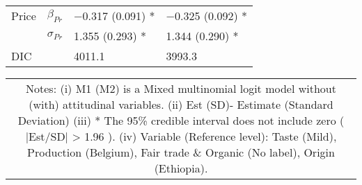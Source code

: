 \documentclass[sustainability,article,accept,moreauthors,pdftex,10pt,a4paper]{Definitions/mdpi}
\theoremstyle{mdpi}
\newcounter{ex}
\newcounter{re}
\theoremstyle{mdpidefinition}
\begin{document}
{{\begin{table}[H]
\begin{tabular}{p{2cm}p{3.5cm} p{3cm} p{3cm}}
\midrule
Price  & $\beta_{Pr}$  &                     $-$0.317 (0.091) *              & $-$0.325 (0.092) *              \\ %
& $\sigma_{Pr}$  &                    1.355 (0.293) *               & 1.344 (0.290) *               \\ \midrule %
DIC       &                      & 4011.1                           & 3993.3                      \\ \bottomrule %
\end{tabular}
\begin{tabular}{@{}c@{}}
\multicolumn{1}{p{\textwidth -.75in}}{\footnotesize Notes: (i) M1 (M2) is a Mixed multinomial logit model without (with) attitudinal variables. (ii) Est (SD)- Estimate (Standard Deviation)
(iii) * The 95\% credible interval does not include zero ( |Est/SD| > 1.96 ). (iv) Variable (Reference level): Taste (Mild), Production (Belgium), Fair trade \& Organic (No label), Origin (Ethiopia).}
\end{tabular}
\end{table}
}
\vspace{-16pt}
}
\end{document}
